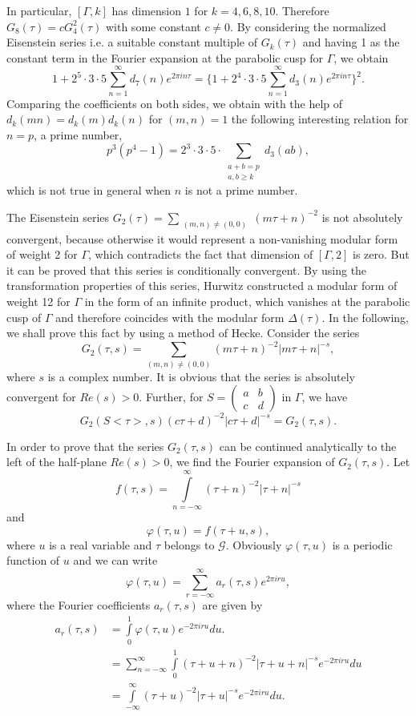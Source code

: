 In particular, $[\Gamma, k]$ has dimension $1$ for
$k=4,6,8,10$. Therefore $G_8(\tau)=c G^2_4(\tau)$ with some constant
$c\neq 0$. By considering the normalized Eisenstein series i.e. a
suitable constant multiple of $G_k(\tau)$ and having 1 as the constant
term in the Fourier expansion at the parabolic cusp for $\Gamma$, we
obtain
$$
1+2^5 \cdot 3\cdot 5 \sum^{\infty}_{n=1} d_7(n) e^{2\pi i n \tau} =
\{1+2^4\cdot 3\cdot 5 \sum^{\infty}_{n=1} d_3(n) e^{2\pi i n \tau}\}^2.
$$
Comparing the coefficients on both sides, we obtain with the help of
$d_k(mn)=d_k (m)d_k(n)$ for $(m,n)=1$ the following interesting
relation for $n=p$, a prime number,
$$
p^3(p^4-1) = 2^3\cdot 3\cdot 5\cdot \sum_{\substack{a+b=p\\a,b\geq k}}
d_3(ab), 
$$
which \pageoriginale is not true in general when $n$ is not a prime
number.

The Eisenstein series $G_2(\tau)=\sum\limits_{\substack{(m,n)\neq
    (0,0)}}(m\tau+n)^{-2}$ is not absolutely convergent, because
otherwise it would represent a non-vanishing modular form of weight 2
for $\Gamma$, which contradicts the fact that dimension of 
$[\Gamma, 2]$ is zero. But it can be proved that this series is conditionally
convergent. By using the transformation properties of this series,
Hurwitz constructed a modular form of weight 12 for $\Gamma$ in the
form of an infinite product, which vanishes at the parabolic cusp of
$\Gamma$ and therefore coincides with the modular form
$\Delta(\tau)$. In the following, we shall prove this fact by using a
method of Hecke. Consider the series 
$$
G_2(\tau, s) = \sum_{(m,n)\neq(0,0)} (m\tau+n)^{-2} |m\tau+n|^{-s},
$$
where $s$ is a complex number. It is obvious that the series is
absolutely convergent for $Re(s)>0$. Further, for $S=
\left(\begin{smallmatrix} a&b\\c&d \end{smallmatrix}\right)$ in
$\Gamma$, we have 
$$
G_2(S<\tau>,s) (c\tau + d)^{-2} |c\tau+d|^{-s} = G_2 (\tau,s).
$$

In order to prove that the series $G_2(\tau,s)$ can be continued
analytically to the left of the half-plane $Re(s)>0$, we find the
Fourier expansion of $G_2(\tau,s)$. Let
$$
f(\tau,s) = \int\limits^{\infty}_{n=-\infty} (\tau+n)^{-2} |\tau+n|^{-s}
$$
and 
$$
\varphi(\tau, u)=f(\tau+u,s),
$$
where \pageoriginale $u$ is a real variable and $\tau$ belongs to
$\mathscr{G}$. Obviously $\varphi(\tau, u)$ is a periodic function of
$u$ and we can write
$$
\varphi(\tau, u) = \sum^{\infty}_{r=-\infty} a_r(\tau, s) e^{2\pi i r u},
$$
where the Fourier coefficients $a_r(\tau,s)$ are given by
\begin{align*}
a_r(\tau, s) & = \int\limits^1_0 \varphi (\tau,u) e^{-2 \pi i r u}
du.\\
& = \sum^{\infty}_{n=-\infty} \int\limits^1_0 (\tau+u+n)^{-2}
|\tau+u+n|^{-s} e^{-2\pi i r u} du\\
& = \int\limits^{\infty}_{-\infty} (\tau+u)^{-2} |\tau+u|^{-s}
e^{-2\pi i r u} du.
\end{align*}

